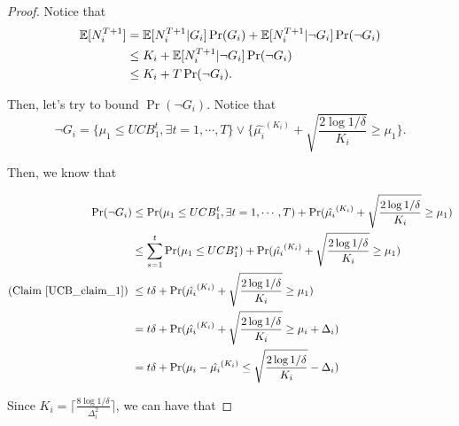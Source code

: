 \documentclass[../main.tex]{subfiles}
\begin{document}
	\begin{proof}
		Notice that 
		\begin{equation*}
			\begin{aligned}
				\mathbb{E}[N_i^{T+1}] & = \mathbb{E}[N_i^{T+1} | G_i] \Pr(G_i) + \mathbb{E}[N_i^{T+1} | \neg G_i] \Pr(\neg G_i)\\
							   & \leq K_i +  \mathbb{E}[N_i^{T+1} | \neg G_i] \Pr(\neg G_i) \\
							   & \leq K_i + T  \Pr(\neg G_i).
			\end{aligned}
		\end{equation*}
		
		Then, let's try to bound $\Pr(\neg G_i)$. Notice that 
		\begin{equation*}
			\neg G_i = \{ \mu_1 \leq UCB_1^t, \exists t = 1,\cdots, T\} \vee \{\hat{\mu_i}^{(K_i)} + \sqrt{\frac{2\log 1/ \delta}{K_i}} \geq \mu_1 \}.
		\end{equation*}		
		
		Then, we know that 
		
		\begin{equation*}
			\begin{aligned}
				\Pr(\neg G_i) & \leq \Pr(\mu_1 \leq UCB_1^t, \exists t = 1,\cdots, T) + \Pr(\hat{\mu_i}^{(K_i)} + \sqrt{\frac{2\log 1/ \delta}{K_i}} \geq \mu_1 ) \\
							  & \leq \sum\limits_{s=1}^t \Pr(\mu_1 \leq UCB_1^s) +   \Pr(\hat{\mu_i}^{(K_i)} + \sqrt{\frac{2\log 1/ \delta}{K_i}} \geq \mu_1 ) \\
							  (\textmd{Claim \ref{UCB_claim_1}})\ & \leq t\delta + \Pr(\hat{\mu_i}^{(K_i)} + \sqrt{\frac{2\log 1/ \delta}{K_i}} \geq \mu_1 ) \\
							  & = t\delta + \Pr(\hat{\mu_i}^{(K_i)} + \sqrt{\frac{2\log 1/ \delta}{K_i}} \geq \mu_i + \Delta_i ) \\
							  & = t\delta + \Pr(\mu_i  - \hat{\mu_i}^{(K_i)} \leq  \sqrt{\frac{2\log 1/ \delta}{K_i}} - \Delta_i ) \\
			\end{aligned}
		\end{equation*}
		
		Since $K_i = \lceil \frac{8 \log 1 / \delta}{\Delta_i^2} \rceil $, we can have that
		

\end{proof}
\end{document}
